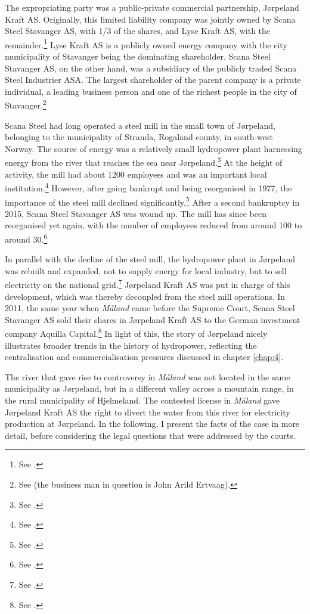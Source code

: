 The expropriating party was a public-private commercial partnership, Jørpeland Kraft AS. Originally, this limited liability company was jointly owned by Scana Steel Stavanger AS, with 1/3 of the shares, and Lyse Kraft AS, with the remainder.\footnote{See \cite[2]{jorpeland09}.} Lyse Kraft AS is a publicly owned energy company with the city municipality of Stavanger being the dominating shareholder. Scana Steel Stavanger AS, on the other hand, was a subsidiary of the publicly traded Scana Steel Industrier ASA. The largest shareholder of the parent company is a private individual, a leading business person and one of the richest people in the city of Stavanger.\footnote{See \cite{birkevold09} (the business man in question is John Arild Ertvaag).}

Scana Steel had long operated a steel mill in the small town of Jørpeland, belonging to the municipality of Stranda, Rogaland county, in south-west Norway. The source of energy was a relatively small hydropower plant harnessing energy from the river that reaches the sea near Jørpeland.\footnote{See \cite{aadland09}.} At the height of activity, the mill had about 1200 employees and was an important local institution.\footnote{See \cite[11]{meland82}.} However, after going bankrupt and being reorganised in 1977, the importance of the steel mill declined significantly.\footnote{See \cite[8-15]{meland82}.} After a second bankruptcy in 2015, Scana Steel Stavanger AS was wound up. The mill has since been reorganised yet again, with the number of employees reduced from around 100 to around 30.\footnote{See \cite{jossang15}.}

In parallel with the decline of the steel mill, the hydropower plant in Jørpeland was rebuilt and expanded, not to supply energy for local industry, but to sell electricity on the national grid.\footnote{See \cite{aadland09}.} Jørpeland Kraft AS was put in charge of this development, which was thereby decoupled from the steel mill operations. In 2011, the same year when {\it Måland} came before the Supreme Court, Scana Steel Stavanger AS sold their shares in Jørpeland Kraft AS to the German investment company Aquilla Capital.\footnote{See \cite{sandvik11}.} In light of this, the story of Jørpeland nicely illustrates broader trends in the history of hydropower, reflecting the centralisation and commercialisation pressures discussed in chapter \ref{chap:4}.

The river that gave rise to controversy in {\it Måland} was not located in the same municipality as Jørpeland, but in a different valley across a mountain range, in the rural municipality of Hjelmeland. The contested license in {\it Måland} gave Jørpeland Kraft AS the right to divert the water from this river for electricity production at Jørpeland. In the following, I present the facts of the case in more detail, before considering the legal questions that were addressed by the courts.

